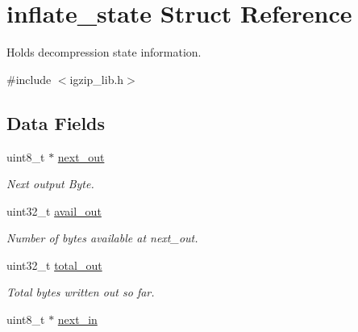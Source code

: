 \hypertarget{structinflate__state}{\section{inflate\-\_\-state Struct Reference}
\label{structinflate__state}
}


Holds decompression state information.  




{\ttfamily \#include $<$igzip\-\_\-lib.\-h$>$}

\subsection*{Data Fields}
\begin{DoxyCompactItemize}
\item 
\hypertarget{structinflate__state_abbf4f563f2d72a00d96ff4fc684d02c6}{uint8\-\_\-t $\ast$ \hyperlink{structinflate__state_abbf4f563f2d72a00d96ff4fc684d02c6}{next\-\_\-out}}\label{structinflate__state_abbf4f563f2d72a00d96ff4fc684d02c6}

\begin{DoxyCompactList}\small\item\em Next output Byte. \end{DoxyCompactList}\item 
\hypertarget{structinflate__state_a8806b67f8aa044f345f64a510fa7ee45}{uint32\-\_\-t \hyperlink{structinflate__state_a8806b67f8aa044f345f64a510fa7ee45}{avail\-\_\-out}}\label{structinflate__state_a8806b67f8aa044f345f64a510fa7ee45}

\begin{DoxyCompactList}\small\item\em Number of bytes available at next\-\_\-out. \end{DoxyCompactList}\item 
\hypertarget{structinflate__state_aa8fe90014653de7ec8b843e2fe4ae7e9}{uint32\-\_\-t \hyperlink{structinflate__state_aa8fe90014653de7ec8b843e2fe4ae7e9}{total\-\_\-out}}\label{structinflate__state_aa8fe90014653de7ec8b843e2fe4ae7e9}

\begin{DoxyCompactList}\small\item\em Total bytes written out so far. \end{DoxyCompactList}\item 
\hypertarget{structinflate__state_a65069a2b7e931db174234fcf68a5a746}{uint8\-\_\-t $\ast$ \hyperlink{structinflate__state_a65069a2b7e931db174234fcf68a5a746}{next\-\_\-in}}\label{structinflate__state_a65069a2b7e931db174234fcf68a5a746}


\end{DoxyCompactItemize}
